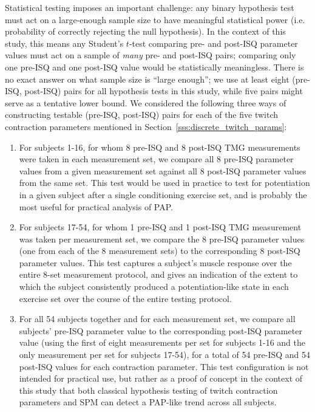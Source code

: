 \documentclass[utf8]{style/FrontiersinHarvard}
\begin{document}
Statistical testing imposes an important challenge:
any binary hypothesis test must act on a large-enough sample size to have meaningful statistical power (i.e. probability of correctly rejecting the null hypothesis).
In the context of this study, this means any Student's $ t $-test comparing pre- and post-ISQ parameter values must act on a sample of \textit{many} pre- and post-ISQ pairs; comparing only one pre-ISQ and one post-ISQ value would be statistically meaningless.
There is no exact answer on what sample size is ``large enough''; we use at least eight (pre-ISQ, post-ISQ) pairs for all hypothesis tests in this study, while five pairs might serve as a tentative lower bound.
We considered the following three ways of constructing testable (pre-ISQ, post-ISQ) pairs for each of the five twitch contraction parameters mentioned in Section~\ref{sss:discrete_twitch_params}:
\begin{enumerate}

    \item For subjects 1-16, for whom 8 pre-ISQ and 8 post-ISQ TMG measurements were taken in each measurement set, we compare all 8 pre-ISQ parameter values from a given measurement set against all 8 post-ISQ parameter values from the same set.
    This test would be used in practice to test for potentiation in a given subject after a single conditioning exercise set, and is probably the most useful for practical analysis of PAP.

    \item For subjects 17-54, for whom 1 pre-ISQ and 1 post-ISQ TMG measurement was taken per measurement set, we compare the 8 pre-ISQ parameter values (one from each of the 8 measurement sets) to the corresponding 8 post-ISQ parameter values.
    This test captures a subject's muscle response over the entire 8-set measurement protocol, and gives an indication of the extent to which the subject consistently produced a potentiation-like state in each exercise set over the course of the entire testing protocol.

    \item For all 54 subjects together and for each measurement set, we compare all subjects' pre-ISQ parameter value to the corresponding post-ISQ parameter value (using the first of eight measurements per set for subjects 1-16 and the only measurement per set for subjects 17-54), for a total of 54 pre-ISQ and 54 post-ISQ values for each contraction parameter.
    This test configuration is not intended for practical use, but rather as a proof of concept in the context of this study that both classical hypothesis testing of twitch contraction parameters and SPM can detect a PAP-like trend across all subjects.

\end{enumerate}
\end{document}
